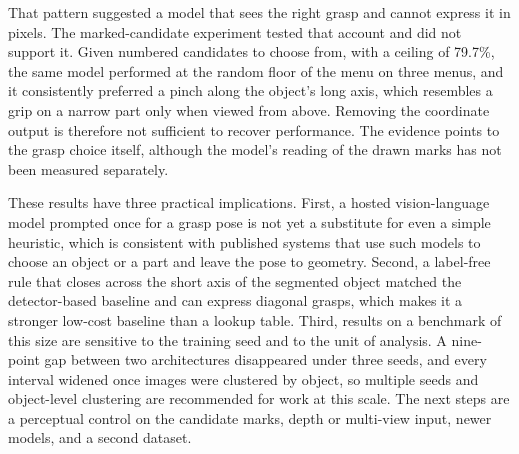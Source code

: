 \documentclass[12pt,letterpaper]{article}
\begin{document}
That pattern suggested a model that sees the right grasp and cannot
express it in pixels. The marked-candidate experiment tested that
account and did not support it. Given numbered candidates to choose
from, with a ceiling of 79.7\%, the same model performed at the random
floor of the menu on three menus, and it consistently preferred a pinch
along the object's long axis, which resembles a grip on a narrow part
only when viewed from above. Removing the coordinate output is therefore
not sufficient to recover performance. The evidence points to the grasp
choice itself, although the model's reading of the drawn marks has not
been measured separately.

These results have three practical implications. First, a hosted
vision-language model prompted once for a grasp pose is not yet a
substitute for even a simple heuristic, which is consistent with
published systems that use such models to choose an object or a part and
leave the pose to geometry. Second, a label-free rule that closes across
the short axis of the segmented object matched the detector-based
baseline and can express diagonal grasps, which makes it a stronger
low-cost baseline than a lookup table. Third, results on a benchmark of
this size are sensitive to the training seed and to the unit of
analysis. A nine-point gap between two architectures disappeared under
three seeds, and every interval widened once images were clustered by
object, so multiple seeds and object-level clustering are recommended
for work at this scale. The next steps are a perceptual control on the
candidate marks, depth or multi-view input, newer models, and a second
dataset.

\end{document}
